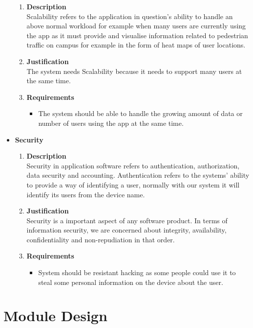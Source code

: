 \documentclass{article}
\begin{document}
\begin{itemize}
			\begin{enumerate}
				\item \textbf{Description} \\
				Scalability refers to the application in question's ability to handle an above normal workload for example when many users are currently using the app as it must provide and visualise information related to pedestrian traffic on campus for example in the form of heat maps of user locations.
				\item \textbf{Justification} \\
				The system needs Scalability because it needs to support many users at the same time.
				\item \textbf{Requirements}
				\begin{itemize}
					\item The system should be able to handle the growing amount of data or number of users using the app at the same time.
				\end{itemize}
			\end{enumerate}
		\item \textbf {Security}
		\begin{enumerate}
			\item \textbf{Description} \\
			Security in application software refers to authentication, authorization, data security and accounting. Authentication refers to the systems' ability to provide a way of identifying a user, normally with our system it will identify its users from the device name.
			\item \textbf{Justification} \\
			Security is a important aspect of any software product. In terms of information security, we are concerned about integrity, availability, confidentiality and non-repudiation in that order. 

			\item \textbf{Requirements}
			\begin{itemize}
				\item System should be resistant hacking as some people could use it to steal some personal information on the device about the user.
			\end{itemize}
		\end{enumerate}
	\end{itemize}
	
	\section{Module Design}
	
\end{document}
